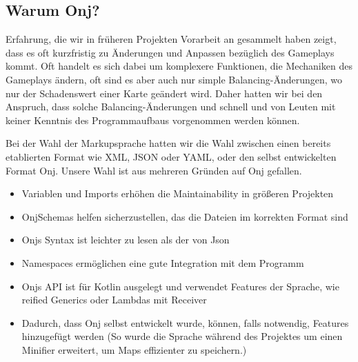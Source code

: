 
\subsection{Warum Onj?}\label{subsec:warum-onj}

\renewcommand{\kapitelautor}{Autor: Marvin Kurka}

Erfahrung, die wir in früheren Projekten \bzw Vorarbeit an \FF gesammelt haben zeigt, dass
es oft kurzfristig zu Änderungen und Anpassen bezüglich des Gameplays kommt.
Oft handelt es sich dabei um komplexere Funktionen, die Mechaniken des Gameplays ändern, oft sind es aber auch nur
simple Balancing-Änderungen, wo \zB nur der Schadenswert einer Karte geändert wird.
Daher hatten wir bei \FF den Anspruch, dass solche Balancing-Änderungen und schnell und von Leuten mit keiner Kenntnis
des Programmaufbaus vorgenommen werden können.

Bei der Wahl der Markupsprache hatten wir die Wahl zwischen einen bereits etablierten Format wie XML, JSON oder YAML,
oder den selbst entwickelten Format Onj.
Unsere Wahl ist aus mehreren Gründen auf Onj gefallen.

\begin{itemize}
    \item Variablen und Imports erhöhen die Maintainability in größeren Projekten
    \item OnjSchemas helfen sicherzustellen, das die Dateien im korrekten Format sind
    \item Onjs Syntax ist leichter zu lesen als \zB der von Json
    \item Namespaces ermöglichen eine gute Integration mit dem Programm
    \item Onjs API ist für Kotlin ausgelegt und verwendet Features der Sprache, wie reified Generics oder
        Lambdas mit Receiver
    \item Dadurch, dass Onj selbst entwickelt wurde, können, falls notwendig, Features hinzugefügt werden (So wurde die
        Sprache \zB während des Projektes um einen Minifier erweitert, um Maps effizienter zu speichern.)
\end{itemize}

\renewcommand{\kapitelautor}{}
